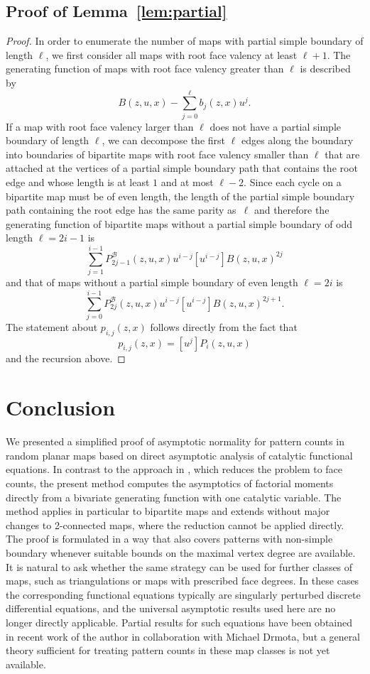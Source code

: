 \documentclass[reqno, 11pt]{amsart}
\theoremstyle{definition}
\theoremstyle{remark}
\numberwithin{equation}{section}
\begin{document}
\subsection{Proof of Lemma~\ref{lem:partial}}
\begin{proof}
	In order to enumerate the number of maps with partial simple boundary of length $\ell$, we first consider all maps with root face valency at least $\ell+1$. The generating function of maps with root face valency greater than $\ell$ is described by
	\[
		B(z,u,x)-\sum_{j=0}^{\ell}b_{j}(z,x)u^{j}.
	\]
	If a map with root face valency larger than $\ell$ does not have a partial simple boundary of length $\ell$, we can decompose the first $\ell$ edges along the boundary into boundaries of bipartite maps with root face valency smaller than $\ell$ that are attached at the vertices of a partial simple boundary path that contains the root edge and whose length is at least $1$ and at most $\ell-2$.
    Since each cycle on a bipartite map must be of even length, the length of the partial simple boundary path containing the root edge has the same parity as~$\ell$ and therefore the generating function of bipartite maps without a partial simple boundary of odd length $\ell = 2i-1$ is 
	\[
		\sum_{j=1}^{i-1}P^{\mathcal{B}}_{2j-1}(z,u,x)u^{i-j}[u^{i-j}]B(z,u,x)^{2j}
	\]
	and that of maps without a partial simple boundary of even length $\ell = 2i$ is 
	\[
		\sum_{j=0}^{i-1}P^{\mathcal{B}}_{2j}(z,u,x)u^{i-j}[u^{i-j}]B(z,u,x)^{2j+1}.
	\]
    The statement about $p_{i,j}(z,x)$ follows directly from the fact that 
    \[
        p_{i,j}(z,x) = [u^j]P_{i}(z,u,x)
    \]
    and the recursion above.
\end{proof}

\section{Conclusion}

We presented a simplified proof of asymptotic normality for pattern counts in random planar maps based on direct asymptotic analysis of catalytic functional equations. In contrast to the approach in \cite{patternocc}, which reduces the problem to face counts, the present method computes the asymptotics of factorial moments directly from a bivariate generating function with one catalytic variable. 
The method applies in particular to bipartite maps and extends without major changes to 2-connected maps, where the reduction  cannot be applied directly. The proof is formulated in a way that also covers patterns with non-simple boundary whenever suitable bounds on the maximal vertex degree are available.
It is natural to ask whether the same strategy can be used for further classes of maps, such as triangulations or maps with prescribed face degrees. In these cases the corresponding functional equations typically are singularly perturbed discrete differential equations, and the universal asymptotic results used here are no longer directly applicable. Partial results for such equations have been obtained in recent work of the author in collaboration with Michael Drmota, but a general theory sufficient for treating pattern counts in these map classes is not yet available.


{}



\end{document}
